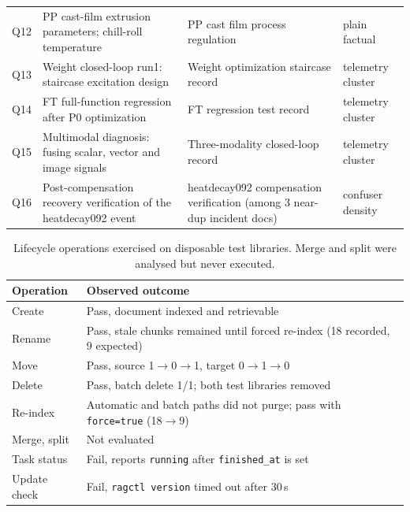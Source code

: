 \begin{table}[!htbp]
\begin{tabular}{lp{5.3cm}p{4.0cm}p{2.8cm}}
Q12 & PP cast-film extrusion parameters; chill-roll temperature & PP cast
film process regulation & plain factual \\
Q13 & Weight closed-loop run1: staircase excitation design & Weight
optimization staircase record & telemetry cluster \\
Q14 & FT full-function regression after P0 optimization & FT regression test
record & telemetry cluster \\
Q15 & Multimodal diagnosis: fusing scalar, vector and image signals &
Three-modality closed-loop record & telemetry cluster \\
Q16 & Post-compensation recovery verification of the heatdecay092 event &
heatdecay092 compensation verification (among 3 near-dup incident docs) &
confuser density \\
\bottomrule
\end{tabular}
\end{table}

\begin{table}[t]
\centering
\small
\setlength{\tabcolsep}{4pt}
\caption{Lifecycle operations exercised on disposable test libraries.
Merge and split were analysed but never executed.}
\label{tab:org-ops}
\begin{tabular}{@{}l>{\raggedright\arraybackslash}p{11.2cm}@{}}
\toprule
Operation & Observed outcome \\
\midrule
Create & Pass, document indexed and retrievable \\
Rename & Pass, stale chunks remained until forced re-index (18 recorded, 9 expected) \\
Move & Pass, source 1$\rightarrow$0$\rightarrow$1, target 0$\rightarrow$1$\rightarrow$0 \\
Delete & Pass, batch delete 1/1; both test libraries removed \\
Re-index & Automatic and batch paths did not purge; pass with \texttt{force=true} (18$\rightarrow$9) \\
Merge, split & Not evaluated \\
Task status & Fail, reports \texttt{running} after \texttt{finished\_at} is set \\
Update check & Fail, \texttt{ragctl version} timed out after 30\,s \\
\bottomrule
\end{tabular}
\end{table}
